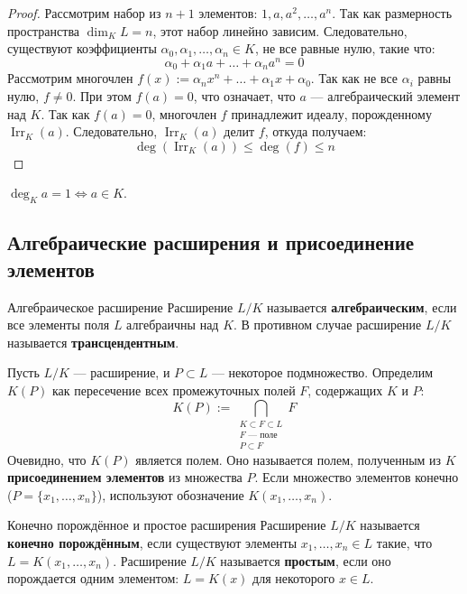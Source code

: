 \begin{proof}
	Рассмотрим набор из $n+1$ элементов: $1, a, a^2, \dots, a^n$.
	Так как размерность пространства $\dim_K L = n$, этот набор линейно зависим.
	Следовательно, существуют коэффициенты $\alpha_0, \alpha_1, \dots, \alpha_n \in K$, не все равные нулю, такие что:
	\[ \alpha_0 + \alpha_1 a + \dots + \alpha_n a^n = 0 \]
	Рассмотрим многочлен $f(x) := \alpha_n x^n + \dots + \alpha_1 x + \alpha_0$. Так как не все $\alpha_i$ равны нулю, $f \ne 0$.
	При этом $f(a) = 0$, что означает, что $a$ --- алгебраический элемент над $K$.
	Так как $f(a) = 0$, многочлен $f$ принадлежит идеалу, порожденному $\operatorname{Irr}_K(a)$.
	Следовательно, $\operatorname{Irr}_K(a)$ делит $f$, откуда получаем:
	\[ \deg(\operatorname{Irr}_K(a)) \le \deg(f) \le n \]
\end{proof}

\begin{Remark}{}{}
	$\deg_K a = 1 \iff a \in K$.
\end{Remark}

\subsection{Алгебраические расширения и присоединение элементов}

\begin{Definition}{Алгебраическое расширение}{}
	Расширение $L/K$ называется \textbf{алгебраическим}, если все элементы поля $L$ алгебраичны над $K$.
	В противном случае расширение $L/K$ называется \textbf{трансцендентным}.
\end{Definition}

Пусть $L/K$ --- расширение, и $P \subset L$ --- некоторое подмножество.
Определим $K(P)$ как пересечение всех промежуточных полей $F$, содержащих $K$ и $P$:
\[ K(P) := \bigcap_{\substack{K \subset F \subset L \\ F \text{ --- поле} \\ P \subset F}} F \]
Очевидно, что $K(P)$ является полем. Оно называется полем, полученным из $K$ \textbf{присоединением элементов} из множества $P$.
Если множество элементов конечно ($P = \{x_1, \dots, x_n\}$), используют обозначение $K(x_1, \dots, x_n)$.

\begin{Definition}{Конечно порождённое и простое расширения}{}
	Расширение $L/K$ называется \textbf{конечно порождённым}, если существуют элементы $x_1, \dots, x_n \in L$ такие, что $L = K(x_1, \dots, x_n)$.
	Расширение $L/K$ называется \textbf{простым}, если оно порождается одним элементом: $L = K(x)$ для некоторого $x \in L$.
\end{Definition}

